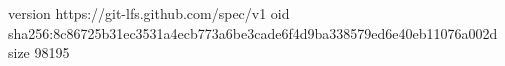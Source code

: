 version https://git-lfs.github.com/spec/v1
oid sha256:8c86725b31ec3531a4ecb773a6be3cade6f4d9ba338579ed6e40eb11076a002d
size 98195
